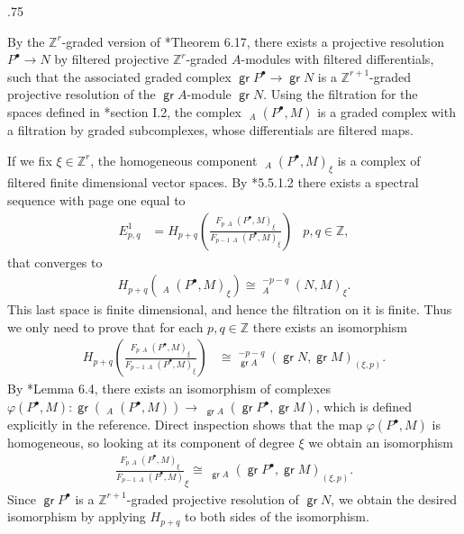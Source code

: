\documentclass[11pt,fleqn]{article}
\makeatletter
\renewenvironment{proof}[1][\textit{Proof}]{\par
  \pushQED{\qed}%
  \normalfont \topsep.75\paraskip\relax
  \trivlist
  \item[\hskip\labelsep
        \itshape
    #1\@addpunct{.}]\ignorespaces
}{%
  \popQED\endtrivlist\@endpefalse
}
\newcommand\ZZ{\mathbb Z}
\renewcommand\to{\longrightarrow}
\renewcommand\phi{\varphi}
\DeclareMathOperator\GrHom{\underline{\mathsf{Hom}}}
\DeclareMathOperator\GrExt{\underline{\mathsf{Ext}}}
\DeclareMathOperator\gr{\mathsf{gr}}
\makeatother
\begin{document}
\begin{proof}
By the $\ZZ^r$-graded version of \cite{MR}*{Theorem 6.17}, there exists a 
projective resolution $P^\bullet \to N$ by filtered projective $\ZZ^r$-graded 
$A$-modules with filtered differentials, such that the associated graded 
complex $\gr P^\bullet \to \gr N$ is a $\ZZ^{r+1}$-graded projective 
resolution of the $\gr A$-module $\gr N$. Using the filtration for the $\GrHom$
spaces defined in \cite{VO}*{section I.2}, the complex $\GrHom_A(P^\bullet, M)$
is a graded complex with a filtration by graded subcomplexes, whose 
differentials are filtered maps.

If we fix $\xi \in \ZZ^r$, the homogeneous component $\GrHom_A(P^\bullet, 
M)_\xi$ is a complex of filtered finite dimensional vector spaces. By 
\cite{W}*{5.5.1.2} there exists a spectral sequence with page one equal to
\begin{align*} 
  E_{p,q}^1 
  &= H_{p+q}\left(\frac{F_p \GrHom_A(P^\bullet,M)_\xi}
      {F_{p-1}  \GrHom_A(P^\bullet,M)_\xi}\right) 
    & p,q \in \ZZ,
\end{align*} 
that converges to   
\begin{align*} 
  H_{p+q}(\GrHom_{A}(P^\bullet,M)_\xi) \cong \GrExt^{-p-q}_A(N,M)_\xi.
\end{align*}
This last space is finite dimensional, and hence the filtration on it is 
finite. Thus we only need to prove that for each $p,q \in \ZZ$ there exists an 
isomorphism
\begin{align*} 
  H_{p+q}
  \left(
    \frac{F_p \GrHom_A(P^\bullet,M)_\xi}{F_{p-1} \GrHom_A(P^\bullet,M)_\xi}
  \right) 
    &\cong \GrExt_{\gr A}^{-p-q}(\gr N, \gr M)_{(\xi,p)}.
\end{align*} 
By \cite{VO}*{Lemma 6.4}, there exists an isomorphism of complexes 
$\phi(P^\bullet, M): \gr (\GrHom_A(P^\bullet, M)) \to \GrHom_{\gr A}(\gr 
P^\bullet, \gr M)$, which is defined explicitly in the reference. Direct 
inspection shows that the map $\phi(P^\bullet, M)$ is homogeneous, so looking 
at its component of degree $\xi$ we obtain an isomorphism
\begin{align*}
\frac{F_p \GrHom_A(P^\bullet,M)_\xi}{F_{p-1} \GrHom_A(P^\bullet,M)}_\xi 
  \cong \GrHom_{\gr A}(\gr P^\bullet, \gr M)_{(\xi,p)}.
\end{align*}
Since $\gr P^\bullet$ is a $\ZZ^{r+1}$-graded projective resolution of $\gr 
N$, we obtain the desired isomorphism by applying $H_{p+q}$ to both sides of 
the isomorphism.
\end{proof}
\end{document}

